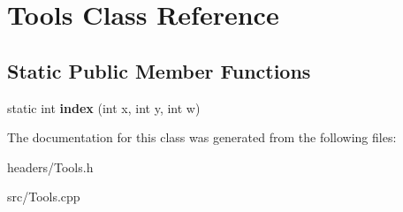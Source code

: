 \hypertarget{class_tools}{\section{Tools Class Reference}
\label{class_tools}
}
\subsection*{Static Public Member Functions}
\begin{DoxyCompactItemize}
\item 
\hypertarget{class_tools_abc81550e37d8addfcd9e4cea4067535b}{static int {\bfseries index} (int x, int y, int w)}\label{class_tools_abc81550e37d8addfcd9e4cea4067535b}

\end{DoxyCompactItemize}


The documentation for this class was generated from the following files\-:\begin{DoxyCompactItemize}
\item 
headers/Tools.\-h\item 
src/Tools.\-cpp\end{DoxyCompactItemize}

